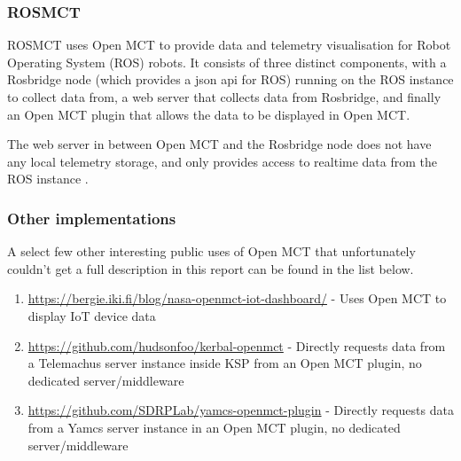 \subsubsection{ROSMCT}
ROSMCT uses Open MCT to provide data and telemetry visualisation for Robot Operating System (ROS) robots. It consists of three distinct components, with a Rosbridge node (which provides a \acrshort{json} \acrshort{api} for ROS) running on the ROS instance to collect data from, a web server that collects data from Rosbridge, and finally an Open MCT plugin that allows the data to be displayed in Open MCT.

The web server in between Open MCT and the Rosbridge node does not have any local telemetry storage, and only provides access to realtime data from the ROS instance \cite{rosmct}. 

\subsubsection{Other implementations}
A select few other interesting public uses of Open MCT that unfortunately couldn't get a full description in this report can be found in the list below.

\begin{enumerate}
  \item \url{https://bergie.iki.fi/blog/nasa-openmct-iot-dashboard/} - Uses Open MCT to display IoT device data
  \item \url{https://github.com/hudsonfoo/kerbal-openmct} - Directly requests data from a Telemachus server instance inside KSP from an Open MCT plugin, no dedicated server/middleware
  \item \url{https://github.com/SDRPLab/yamcs-openmct-plugin} - Directly requests data from a Yamcs server instance in an Open MCT plugin, no dedicated server/middleware
\end{enumerate}